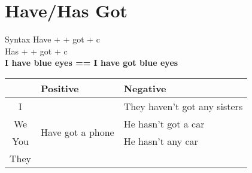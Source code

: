 \documentclass{elegantbook}
\begin{document}
        \section{Have/Has Got}
        \begin{corollary}{Syntax}{}
            Have + \dSmiley[2] + got + c\\
            Has + \dSmiley[2] + got + c
            \textbf{\\I have blue eyes == I have got blue eyes}
        \end{corollary}
        \begin{tabular}{|c|l|l|}
            \hline
            &\textbf{Positive}&\textbf{Negative}\\
            \hline
            I&\multirow{4}{10em}{Have got a phone}&They haven't got any sisters\\
            We&&He hasn't got a car\\
            You&&He hasn't any car\\
            They\\
            \hline
        \end{tabular}
\end{document}
